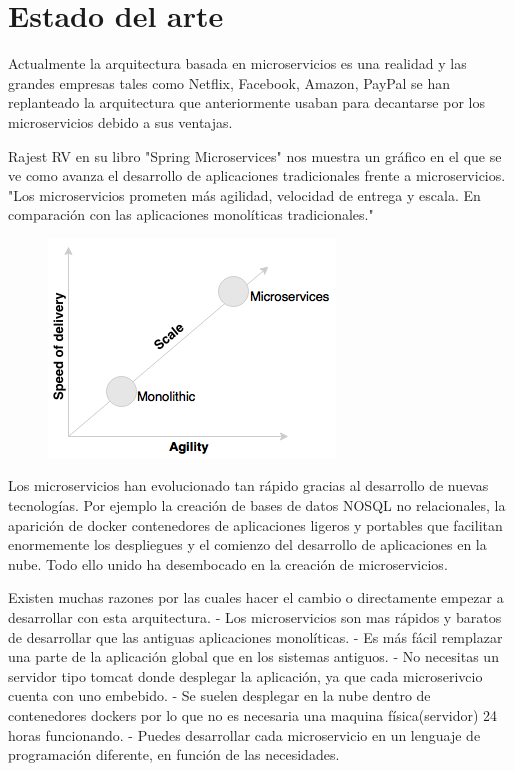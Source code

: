 \documentclass[12pt]{report} %
\begin{document}
\section{Estado del arte}
	Actualmente la arquitectura basada en microservicios es una realidad y las grandes empresas tales como Netflix, Facebook, Amazon, PayPal se han replanteado la arquitectura que anteriormente usaban para decantarse por los microservicios debido a sus ventajas.

	Rajest RV en su libro "Spring Microservices"\cite{rv2016spring} nos muestra un gráfico en el que se ve como avanza el desarrollo de aplicaciones tradicionales frente a microservicios. "Los microservicios prometen más agilidad, velocidad de entrega y escala. En comparación con las aplicaciones monolíticas tradicionales."
	
	\begin{figure}
		\centering
		\includegraphics[width=0.7\linewidth]{imagenes/desarrolloMonovsMicro}
		\caption{}
		\label{fig:desarrollomonovsmicro}
	\end{figure}

	Los microservicios han evolucionado tan rápido gracias al desarrollo de nuevas tecnologías. Por ejemplo la creación de bases de datos NOSQL no relacionales, la aparición de docker contenedores de aplicaciones ligeros y portables que facilitan enormemente los despliegues y el comienzo del desarrollo de aplicaciones en la nube. Todo ello unido ha desembocado en la creación de microservicios.
	
	Existen muchas razones por las cuales hacer el cambio o directamente empezar a desarrollar con esta arquitectura. 
	- Los microservicios son mas rápidos y baratos de desarrollar que las antiguas aplicaciones monolíticas. 
	- Es más fácil remplazar una parte de la aplicación global que en los sistemas antiguos. 
	- No necesitas un servidor tipo tomcat donde desplegar la aplicación, ya que cada microserivcio cuenta con uno embebido.
	- Se suelen desplegar en la nube dentro de contenedores dockers por lo que no es necesaria una maquina física(servidor) 24 horas funcionando.
	- Puedes desarrollar cada microservicio en un lenguaje de programación diferente, en función de las necesidades.
	
\end{document}
